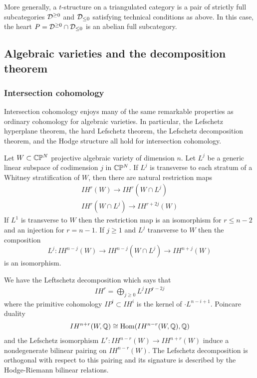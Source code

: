 \documentclass[12pt]{article}
\begin{document}
\begin{remark}
    More generally, a $t$-structure on a
    triangulated category is a pair of strictly full subcategories ${\mathcal{D}}^{\geq 0}$
    and ${\mathcal{D}}_{\leq 0}$ satisfying technical
    conditions as above. In this case, the heart $P = {\mathcal{D}}^{\geq 0}\cap {\mathcal{D}}_{\leq 0}$
    is an abelian full subcategory.
\end{remark}

\subsection{Algebraic varieties and the decomposition theorem}
\subsubsection{Intersection cohomology}
Intersection cohomology enjoys many of the same remarkable properties as ordinary
cohomology for algebraic varieties. In particular, the Lefschetz hyperplane theorem,
the hard Lefschetz theorem, the Lefschetz decomposition theorem, and the
Hodge structure all hold for intersection cohomology.

\begin{theorem}
    Let $W\subset \mathbb{C}\mathbb{P}^N$ projective algebraic variety of dimension $n$.
    Let $L^j$ be a generic linear subspace of codimension $j$ in $\mathbb{C}\mathbb{P}^N$.
    If $L^j$ is transverse to each stratum of a Whitney stratification of $W$,
    then there are natural restriction maps \begin{align*}
        IH^r(W) \to IH^r(W\cap L^j) \\
        IH^r(W\cap L^j) \to IH^{r+2j}(W)
    \end{align*} If $L^1$ is transverse to $W$ then
    the restriction map is an isomorphism for $r\leq n-2$ and an injection for $r = n-1$.
    If $j\geq 1$ and $L^j$ transverse to $W$ then the composition
    \[L^j:IH^{n-j}(W) \to IH^{n-j}(W\cap L^j) \to IH^{n+j}(W)\] is an isomorphism.
\end{theorem}

\begin{theorem}
    We have the Leftschetz decomposition which says that \begin{align*}
        IH^r = \bigoplus_{j\geq 0} L^jIP^{r-2j}
    \end{align*} where the primitive cohomology
    $IP^i\subset IH^i$ is the kernel of $\cdot L^{n-i+1}$. Poincare duality \begin{align*}
        IH^{n+r}(W,\mathbb{Q}) \cong \operatorname{Hom}(IH^{n-r}(W,\mathbb{Q}),\mathbb{Q})
    \end{align*} and the Lefschetz isomorphism $L^r: IH^{n-r}(W) \to IH^{n+r}(W)$
    induce a nondegenerate bilinear pairing on $IH^{n-r}(W)$. The Lefschetz decomposition is orthogonal
    with respect to this pairing and its signature is described by the Hodge-Riemann bilinear relations.
\end{theorem}
\end{document}
